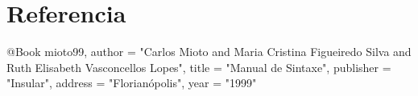 




\section{Referencia} 

@Book{ mioto99,
	author = "Carlos Mioto and Maria Cristina Figueiredo Silva and Ruth Elisabeth Vasconcellos Lopes",
	title = "Manual de Sintaxe",
	publisher = "Insular",
	address = "Florian{\'o}polis",
	year = "1999"
}



		



 

	

